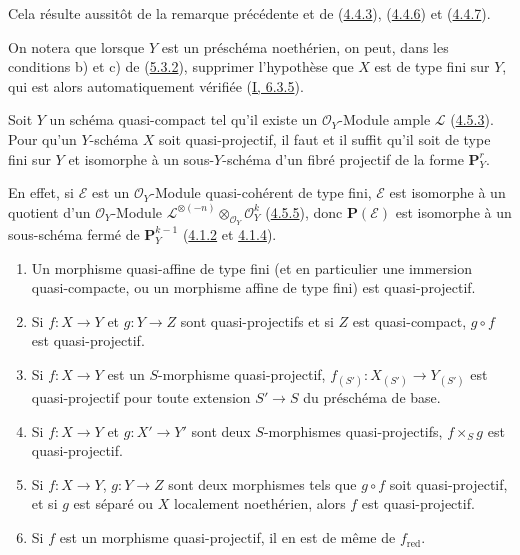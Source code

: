 Cela résulte aussitôt de la remarque précédente et de
(\hyperref[II.4.4.3-fr]{4.4.3}), (\hyperref[II.4.4.6-fr]{4.4.6}) et
(\hyperref[II.4.4.7-fr]{4.4.7}).

On notera que lorsque $Y$ est un préschéma noethérien, on peut, dans les
conditions b) et c) de (\hyperref[II.5.3.2-fr]{5.3.2}), supprimer
l'hypothèse que $X$ est de type fini sur $Y$, qui est alors automatiquement
vérifiée (\hyperref[I.6.3.5-fr]{I, 6.3.5}).

\begin{corollary}[5.3.3]
\label{II.5.3.3-fr}
Soit $Y$ un schéma quasi-compact tel qu'il existe un $\mathcal{O}_Y$-Module
ample $\mathcal{L}$ (\hyperref[II.4.5.3-fr]{4.5.3}). Pour qu'un $Y$-schéma
$X$ soit quasi-projectif, il faut et il suffit qu'il soit de type fini sur
$Y$ et isomorphe à un sous-$Y$-schéma d'un fibré projectif de la forme
$\mathbf{P}_Y^r$.
\end{corollary}

En effet, si $\mathcal{E}$ est un $\mathcal{O}_Y$-Module quasi-cohérent de
type fini, $\mathcal{E}$ est isomorphe à un quotient d'un
$\mathcal{O}_Y$-Module
$\mathcal{L}^{\otimes(-n)}\otimes_{\mathcal{O}_Y}\mathcal{O}_Y^k$
(\hyperref[II.4.5.5-fr]{4.5.5}), donc $\mathbf{P}(\mathcal{E})$ est
isomorphe à un sous-schéma fermé de $\mathbf{P}_Y^{k-1}$
(\hyperref[II.4.1.2-fr]{4.1.2} et \hyperref[II.4.1.4-fr]{4.1.4}).

\begin{proposition}[5.3.4]
\label{II.5.3.4-fr}
\begin{enumerate}
  \item[\rm{(i)}] Un morphisme quasi-affine de type fini (et en particulier
  une immersion quasi-compacte, ou un morphisme affine de type fini) est
  quasi-projectif.
  \item[\rm{(ii)}] Si $f:X\to Y$ et $g:Y\to Z$ sont quasi-projectifs et si
  $Z$ est quasi-compact, $g\circ f$ est quasi-projectif.


  \item[\rm{(iii)}] Si $f:X\to Y$ est un $S$-morphisme quasi-projectif,
  $f_{(S')}:X_{(S')}\to Y_{(S')}$ est quasi-projectif pour toute extension
  $S'\to S$ du préschéma de base.
  \item[\rm{(iv)}] Si $f:X\to Y$ et $g:X'\to Y'$ sont deux $S$-morphismes
  quasi-projectifs, $f\times_Sg$ est quasi-projectif.
  \item[\rm{(v)}] Si $f:X\to Y$, $g:Y\to Z$ sont deux morphismes tels que
  $g\circ f$ soit quasi-projectif, et si $g$ est séparé ou $X$ localement
  noethérien, alors $f$ est quasi-projectif.
  \item[\rm{(vi)}] Si $f$ est un morphisme quasi-projectif, il en est de
  même de $f_{\mathrm{red}}$.
\end{enumerate}
\end{proposition}

